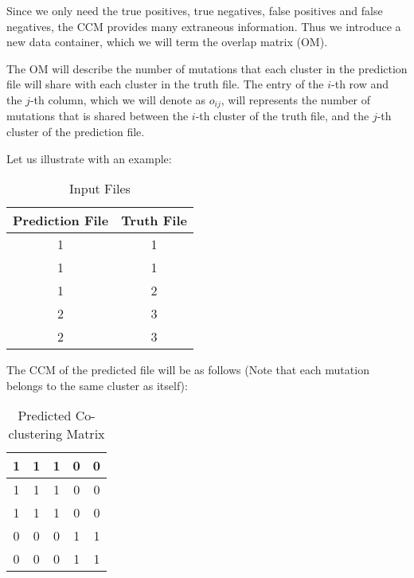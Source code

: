 \documentclass[a4paper, 11pt]{article}
\begin{document}
Since we only need the true positives, true negatives, false positives and false negatives, the CCM provides many extraneous information. Thus we introduce a new data container, which we will term the overlap matrix (OM).

The OM will describe the number of mutations that each cluster in the prediction file will share with each cluster in the truth file. The entry of the $i$-th row and the $j$-th column, which we will denote as $o_{ij}$, will represents the number of mutations that is shared between the $i$-th cluster of the truth file, and the $j$-th cluster of the prediction file.

Let us illustrate with an example:

\begin{center}
    \begin{table}[ht]
    \centering
    \begin{tabular}{||c c||}
    \hline
    Prediction File & Truth File \\ 
    \hline\hline
    1 & 1 \\
    \hline
    1 & 1 \\
    \hline
    1 & 2 \\
    \hline
    2 & 3 \\
    \hline
    2 & 3 \\ 
    \hline
    \end{tabular}
    \caption{Input Files}
    \label{table:files}
    \end{table}
\end{center}

The CCM of the predicted file will be as follows (Note that each mutation belongs to the same cluster as itself):

\begin{center}
    \begin{table}[ht]
    \centering
    \begin{tabular}{||c c c c c||}
    \hline
    1 & 1 & 1 & 0 & 0\\
    \hline
    1 & 1 & 1 & 0 & 0\\
    \hline
    1 & 1 & 1 & 0 & 0\\
    \hline
    0 & 0 & 0 & 1 & 1\\
    \hline
    0 & 0 & 0 & 1 & 1\\
    \hline
    \end{tabular}
    \caption{Predicted Co-clustering Matrix}
    \label{table:ccm_pred}
    \end{table}
\end{center}
\end{document}
